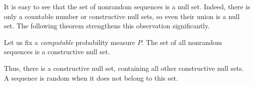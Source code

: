 It is easy to see that the set of nonrandom sequences is a null set.
Indeed, there is only a countable number or constructive null sets,
so even their union is a null set.
The following theorem strengthens this observation significantly.

\begin{theorem}\label{thm:univ-seq-test}
  \leanok
Let us fix a \emph{computable} probability measure \( P \).
The set of all nonrandom sequences is a constructive null set.
\end{theorem}
Thus, there is a  constructive null set, containing all other
constructive null sets.
A sequence is random when it does not belong to this set.
